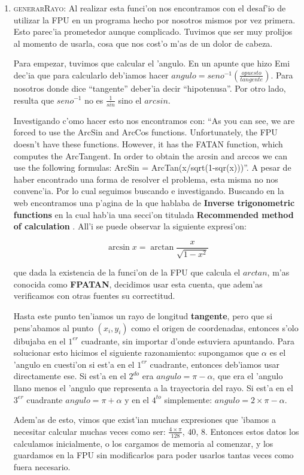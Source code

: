 \begin{enumerate}
\item \textsc{generarRayo}:
	Al realizar esta funci'on nos encontramos con el desaf'io de utilizar la
FPU en un programa hecho por nosotros mismos por vez primera. Esto parec'ia
prometedor aunque complicado. Tuvimos que ser muy prolijos al momento de
usarla, cosa que nos cost'o m'as de un dolor de cabeza.

	Para empezar, tuvimos que calcular el 'angulo. En un apunte que hizo Emi
dec'ia que para calcularlo deb'iamos hacer
$angulo=seno^{-1}(\frac{opuesto}{tangente})$. Para nosotros donde dice ``tangente''
deber'ia decir ``hipotenusa''. Por otro lado, resulta que $seno^{-1}$ no es 
$\frac{1}{sin}$ sino el $arcsin$.

	Investigando c'omo hacer esto nos encontramos con: ``As you can see, we are
forced to use the ArcSin and ArcCos functions. Unfortunately, the FPU doesn't
have these functions. However, it has the FATAN function, which computes the
ArcTangent. In order to obtain the arcsin and arccos we can use the following
formulas: ArcSin = ArcTan(x/sqrt(1-sqr(x)))''\cite{VLJ}. A pesar de haber
encontrado una forma de resolver el problema, esta misma no nos convenc'ia. Por
lo cual seguimos buscando e investigando. Buscando en la web encontramos una
p'agina de la \cite{WIKI} que hablaba de \textbf{Inverse trigonometric
functions} en la cual hab'ia una secci'on titulada \textbf{Recommended method
of calculation} \cite{WIKITRI}. All'i se puede observar la siguiente
expresi'on:

$$\arcsin x = \arctan \frac{x}{\sqrt{1-x^2}}$$

que dada la existencia de la funci'on de la FPU que calcula el $arctan$, m'as
conocida como \textbf{FPATAN}, decidimos usar esta cuenta, que adem'as verificamos con
otras fuentes su correctitud.

Hasta este punto ten'iamos un rayo de longitud \textbf{tangente}, pero que si
pens'abamos al punto $(x_i,y_i)$ como el origen de coordenadas, entonces s'olo
dibujaba en el $1^{er}$ cuadrante, sin importar d'onde estuviera apuntando.
Para solucionar esto hicimos el siguiente razonamiento: supongamos que $\alpha$
es el 'angulo en cuesti'on si est'a en el $1^{er}$ cuadrante, entonces
deb'iamos usar directamente ese. Si est'a en el $2^{do}$ era $angulo = \pi -
\alpha$, que era el 'angulo llano menos el 'angulo que representa a la
trayectoria del rayo. Si est'a en el $3^{er}$ cuadrante $angulo = \pi + \alpha$
y en el $4^{to}$ simplemente: $angulo = 2 \times \pi - \alpha$.

Adem'as de esto, vimos que exist'ian muchas expresiones que 'ibamos a necesitar
calcular muchas veces como ser: $\frac{4\times\pi}{128}$, $40$, $8$. Entonces
estos datos los calculamos inicialmente, o los cargamos de memoria al comenzar,
y los guardamos en la FPU sin modificarlos para poder usarlos tantas veces como
fuera necesario.


\end{enumerate}
